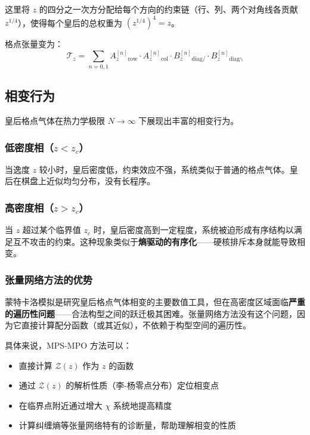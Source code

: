 \documentclass[12pt,a4paper]{ctexart}
\begin{document}
这里将 $z$ 的四分之一次方分配给每个方向的约束链（行、列、两个对角线各贡献 $z^{1/4}$），使得每个皇后的总权重为 $(z^{1/4})^4 = z$。

格点张量变为：
\begin{equation}
\mathcal{T}_z = \sum_{n=0,1} A_z^{[n]}_{\text{row}} \cdot A_z^{[n]}_{\text{col}} \cdot B_z^{[n]}_{\text{diag}/} \cdot B_z^{[n]}_{\text{diag}\backslash}
\end{equation}

\subsection{相变行为}

皇后格点气体在热力学极限 $N \to \infty$ 下展现出丰富的相变行为。

\subsubsection*{低密度相（$z < z_c$）}

当逸度 $z$ 较小时，皇后密度低，约束效应不强，系统类似于普通的格点气体。皇后在棋盘上近似均匀分布，没有长程序。

\subsubsection*{高密度相（$z > z_c$）}

当 $z$ 超过某个临界值 $z_c$ 时，皇后密度高到一定程度，系统被迫形成有序结构以满足互不攻击的约束。这种现象类似于\textbf{熵驱动的有序化}——硬核排斥本身就能导致相变。

\subsubsection*{张量网络方法的优势}

蒙特卡洛模拟是研究皇后格点气体相变的主要数值工具，但在高密度区域面临\textbf{严重的遍历性问题}——合法构型之间的跃迁极其困难。张量网络方法没有这个问题，因为它直接计算配分函数（或其近似），不依赖于构型空间的遍历性。

具体来说，MPS-MPO 方法可以：
\begin{itemize}
    \item 直接计算 $\mathcal{Z}(z)$ 作为 $z$ 的函数
    \item 通过 $\mathcal{Z}(z)$ 的解析性质（李-杨零点分布）定位相变点
    \item 在临界点附近通过增大 $\chi$ 系统地提高精度
    \item 计算纠缠熵等张量网络特有的诊断量，帮助理解相变的性质
\end{itemize}
\end{document}
